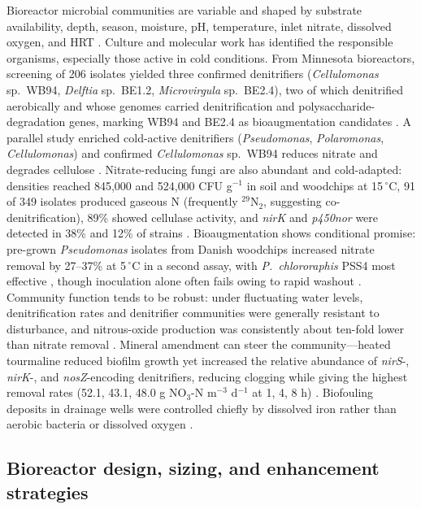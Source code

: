 Bioreactor microbial communities are variable and shaped by substrate availability, depth, season, moisture, pH, temperature, inlet nitrate, dissolved oxygen, and HRT \parencite{Hartfiel2022}. Culture and molecular work has identified the responsible organisms, especially those active in cold conditions. From Minnesota bioreactors, screening of 206 isolates yielded three confirmed denitrifiers (\textit{Cellulomonas} sp.\ WB94, \textit{Delftia} sp.\ BE1.2, \textit{Microvirgula} sp.\ BE2.4), two of which denitrified aerobically and whose genomes carried denitrification and polysaccharide-degradation genes, marking WB94 and BE2.4 as bioaugmentation candidates \parencite{Anderson2020}. A parallel study enriched cold-active denitrifiers (\textit{Pseudomonas}, \textit{Polaromonas}, \textit{Cellulomonas}) and confirmed \textit{Cellulomonas} sp.\ WB94 reduces nitrate and degrades cellulose \parencite{Jang2019}. Nitrate-reducing fungi are also abundant and cold-adapted: densities reached 845{,}000 and 524{,}000 CFU g$^{-1}$ in soil and woodchips at 15\,$^{\circ}$C, 91 of 349 isolates produced gaseous N (frequently $^{29}$N$_2$, suggesting co-denitrification), 89\% showed cellulase activity, and \textit{nirK} and \textit{p450nor} were detected in 38\% and 12\% of strains \parencite{Aldossari2021}. Bioaugmentation shows conditional promise: pre-grown \textit{Pseudomonas} isolates from Danish woodchips increased nitrate removal by 27--37\% at 5\,$^{\circ}$C in a second assay, with \textit{P.\ chlororaphis} PSS4 most effective \parencite{Jeglot2022}, though inoculation alone often fails owing to rapid washout \parencite{Wang2025b}. Community function tends to be robust: under fluctuating water levels, denitrification rates and denitrifier communities were generally resistant to disturbance, and nitrous-oxide production was consistently about ten-fold lower than nitrate removal \parencite{Hathaway2017}. Mineral amendment can steer the community---heated tourmaline reduced biofilm growth yet increased the relative abundance of \textit{nirS}-, \textit{nirK}-, and \textit{nosZ}-encoding denitrifiers, reducing clogging while giving the highest removal rates (52.1, 43.1, 48.0 g NO$_3$-N m$^{-3}$ d$^{-1}$ at 1, 4, 8 h) \parencite{Ma2021}. Biofouling deposits in drainage wells were controlled chiefly by dissolved iron rather than aerobic bacteria or dissolved oxygen \parencite{Stuetz2004}.

\subsection{Bioreactor design, sizing, and enhancement strategies}


